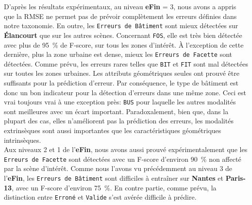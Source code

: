        D'après les résultats expérimentaux, au niveau \textbf{eFin} = 3, nous avons a appris que la RMSE ne permet pas de prévoir complètement les erreurs définies dans notre taxonomie.
        En outre, les \texttt{Erreurs de Bâtiment} sont mieux détectées sur \textbf{\'Elancourt} que sur les autres scènes.
        Concernant \texttt{FOS}, elle est très bien détectée avec plus de \SI[locale=FR]{95}{\percent} de F-score, sur tous les zones d'intérêt.
        \`A l'exception de cette dernière, plus la zone urbaine est dense, mieux les \texttt{Erreurs de Facette} sont détectées.
        Comme prévu, les erreurs rares telles que \texttt{BIT} et \texttt{FIT} sont mal détectées sur toutes les zones urbaines.
        Les attributs géométriques seules ont prouvé être suffisants pour la prédiction d'erreur.
        Par conséquence, le type de bâtiment est donc un bon indicateur pour la détection d'erreurs dans une même zone.
        Ceci est vrai toujours vrai à une exception près: \texttt{BUS} pour laquelle les autres modalités sont meilleures avec un écart important.
        Paradoxalement, bien que, dans la plupart des cas, elles n'améliorent pas la prédiction des erreurs, les modalités extrinsèques sont aussi importantes que les caractéristiques géométriques intrinsèques.\\

        Aux niveaux 2 et 1 de l'\textbf{eFin}, nous avons aussi prouvé expérimentalement que les \texttt{Erreurs de Facette} sont détectées avec un F-score d'environ \SI[locale=FR]{90}{\percent} non affecté par la scène d'intérêt.
        Comme nous l'avons vu précédemment au niveau 3 de l'\textbf{eFin}, les \texttt{Erreurs de Bâtiment} sont difficiles à entraîner sur \textbf{Nantes} et \textbf{Paris-13}, avec un F-score d'environ \SI[locale=FR]{75}{\percent}.
        En contre partie, comme prévu, la distinction entre \texttt{Erroné} et \texttt{Valide} s'est avérée difficile à prédire.


